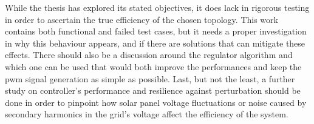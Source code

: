 While the thesis has explored its stated objectives, it does lack in rigorous testing in order to ascertain the true efficiency of the chosen topology.
This work contains both functional and failed test cases, but it needs a proper investigation in why this behaviour appears, and if there are solutions that can mitigate these effects.
There should also be a discussion around the regulator algorithm and which one can be used that would both improve the performances and keep the \gls{pwm} signal generation as simple as possible.
Last, but not the least, a further study on controller's performance and resilience against perturbation should be done in order to pinpoint how solar panel voltage fluctuations or noise caused by secondary harmonics in the grid's voltage affect the efficiency of the system.